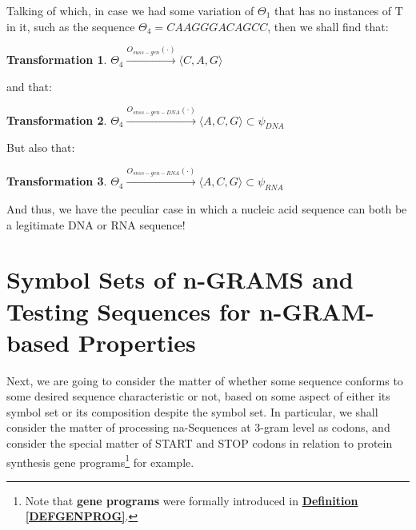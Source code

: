 \documentclass[a4paper, 18pt]{book} %
\newtheorem{trans}{Transformation}
\begin{document}
Talking of which, in case we had some variation of $\Theta_1$ that has no instances of T in it, such as the sequence $\Theta_4 = CAAGGGACAGCC$, then we shall find that:

\vspace{1em}

\begin{trans}
$\Theta_4 \xrightarrow{O_{suss-gen}(\cdot)} \langle C, A, G \rangle$
\end{trans}

\vspace{1em}

and that:

\vspace{1em}

\begin{trans}
$\Theta_4 \xrightarrow{O_{snss-gen-DNA}(\cdot)} \langle A, C, G \rangle \subset \psi_{DNA}$
\end{trans}

\vspace{1em}

But also that:

\vspace{1em}

\begin{trans}
$\Theta_4 \xrightarrow{O_{snss-gen-RNA}(\cdot)} \langle A, C, G \rangle \subset \psi_{RNA}$
\end{trans}

\vspace{1em}

And thus, we have the peculiar case in which a nucleic acid sequence can both be a legitimate DNA or RNA sequence! 


\section{Symbol Sets of n-GRAMS and Testing Sequences for n-GRAM-based Properties}
\label{SECSYMBOLSETSNGRAMS}

Next, we are going to consider the matter of whether some sequence conforms to some desired sequence characteristic or not, based on some aspect of either its symbol set or its composition despite the symbol set. In particular, we shall consider the matter of processing na-Sequences at 3-gram level as codons, and consider the special matter of START and STOP codons in relation to protein synthesis gene programs\footnote{Note that \textbf{gene programs} were formally introduced in \textbf{\hyperref[DEFGENPROG]{Definition \ref{DEFGENPROG}}}.} for example.
\end{document}
